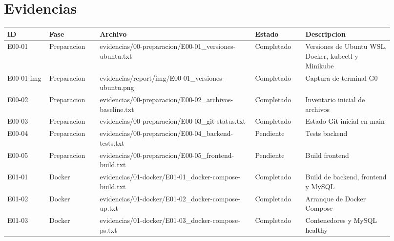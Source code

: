\section{Evidencias}\label{evidencias}

{\def\LTcaptype{none} %
\footnotesize
\setlength{\tabcolsep}{3pt}
\label{tab:inventario-evidencias}
\begin{longtable}[]{@{}>{\raggedright\arraybackslash}p{0.10\linewidth}>{\raggedright\arraybackslash}p{0.12\linewidth}>{\raggedright\arraybackslash}p{0.37\linewidth}>{\raggedright\arraybackslash}p{0.12\linewidth}>{\raggedright\arraybackslash}p{0.21\linewidth}@{}}
\toprule\noalign{}
ID & Fase & Archivo & Estado & Descripcion \\
\midrule\noalign{}
\endhead
\bottomrule\noalign{}
\endlastfoot
E00-01 & Preparacion & evidencias/\allowbreak{}00-preparacion/\allowbreak{}E00-01\_\allowbreak{}versiones-ubuntu.txt & Completado & Versiones de Ubuntu WSL, Docker, kubectl y Minikube \\
E00-01-img & Preparacion & evidencias/\allowbreak{}report/\allowbreak{}img/\allowbreak{}E00-01\_\allowbreak{}versiones-ubuntu.png & Completado & Captura de terminal G0 \\
E00-02 & Preparacion & evidencias/\allowbreak{}00-preparacion/\allowbreak{}E00-02\_\allowbreak{}archivos-baseline.txt & Completado & Inventario inicial de archivos \\
E00-03 & Preparacion & evidencias/\allowbreak{}00-preparacion/\allowbreak{}E00-03\_\allowbreak{}git-status.txt & Completado & Estado Git inicial en main \\
E00-04 & Preparacion & evidencias/\allowbreak{}00-preparacion/\allowbreak{}E00-04\_\allowbreak{}backend-tests.txt & Pendiente & Tests backend \\
E00-05 & Preparacion & evidencias/\allowbreak{}00-preparacion/\allowbreak{}E00-05\_\allowbreak{}frontend-build.txt & Pendiente & Build frontend \\
E01-01 & Docker & evidencias/\allowbreak{}01-docker/\allowbreak{}E01-01\_\allowbreak{}docker-compose-build.txt & Completado & Build de backend, frontend y MySQL \\
E01-02 & Docker & evidencias/\allowbreak{}01-docker/\allowbreak{}E01-02\_\allowbreak{}docker-compose-up.txt & Completado & Arranque de Docker Compose \\
E01-03 & Docker & evidencias/\allowbreak{}01-docker/\allowbreak{}E01-03\_\allowbreak{}docker-compose-ps.txt & Completado & Contenedores y MySQL healthy \\

\end{longtable}}
